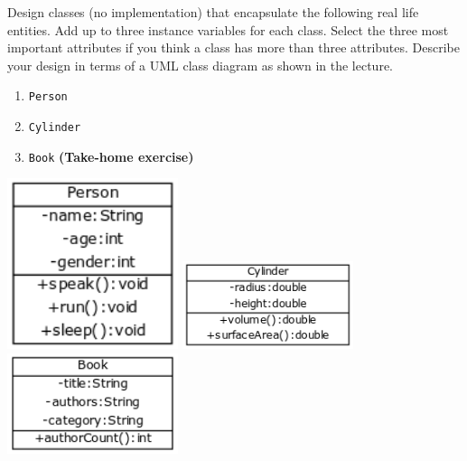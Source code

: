 \begin{questions}
\newpage
\question Design classes (no implementation) that encapsulate the following real life entities. Add up to three instance variables for each class. Select the three most important attributes if you think a class has more than three attributes. Describe your design in terms of a UML class diagram as shown in the lecture.

\begin{enumerate}
\item \texttt{Person}
\item \texttt{Cylinder}
\item \texttt{Book} \textbf{(Take-home exercise)}
\end{enumerate}

\begin{solution}
\includegraphics[width=5cm]{Person.png}
\vskip 0.5cm
\includegraphics[width=5cm]{Cylinder.png}
\vskip 0.5cm
\includegraphics[width=5cm]{Book.png}
\vskip 0.5cm
\end{solution}

\question 

\end{questions}
